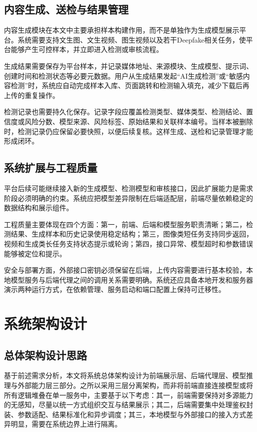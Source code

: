 \subsection{内容生成、送检与结果管理}

内容生成模块在本文中主要承担样本构建作用，而不是单独作为生成模型展示平台。系统需要支持文生图、文生视频、图生视频以及若干Deepfake相关任务，使平台能够产生可控样本，并立即进入检测或审核流程。

生成结果需要保存为平台样本，并记录媒体地址、来源模块、生成模型、提示词、创建时间和检测状态等必要元数据。用户从生成结果发起“AI生成检测”或“敏感内容检测”时，系统应自动完成样本入库、页面跳转和检测输入填充，减少下载后再上传的重复操作。

检测记录也需要持久化保存。记录字段应覆盖检测类型、媒体类型、检测结论、置信度或风险分数、模型来源、风险标签、原始结果和关联样本编号。当样本被删除时，检测记录仍应保留必要快照，以便后续复核。这样生成、送检和记录管理才能形成闭环。

\subsection{系统扩展与工程质量}

平台后续可能继续接入新的生成模型、检测模型和审核接口，因此扩展能力是需求阶段必须明确的约束。系统应把模型差异限制在后端适配层，前端尽量依赖稳定的数据结构和展示组件。

工程质量主要体现在四个方面：第一，前端、后端和模型服务职责清晰；第二，检测结果、生成样本和历史记录使用稳定结构；第三，图像类短任务支持同步返回，视频和生成类长任务支持状态提示或轮询；第四，接口异常、模型超时和参数错误能够被定位和提示。

安全与部署方面，外部接口密钥必须保留在后端，上传内容需要进行基本校验，本地模型服务与后端代理之间的调用关系需要明确。系统还应具备本地开发和服务器演示两种运行方式，在依赖管理、服务启动和端口配置上保持可迁移性。

\section{系统架构设计}

\subsection{总体架构设计思路}

基于前述需求分析，本文将系统总体架构设计为前端展示层、后端代理层、模型推理与外部能力层三部分。之所以采用三层分离架构，而非将前端直接连接模型或将所有逻辑堆叠在单一服务中，主要基于以下考虑：其一，前端需要保持对多源能力的无感知，尽量以统一方式组织交互与结果展示；其二，后端需要集中处理鉴权封装、参数适配、结果标准化和异步调度；其三，本地模型与外部接口的接入方式差异明显，需要在系统边界上进行隔离。

